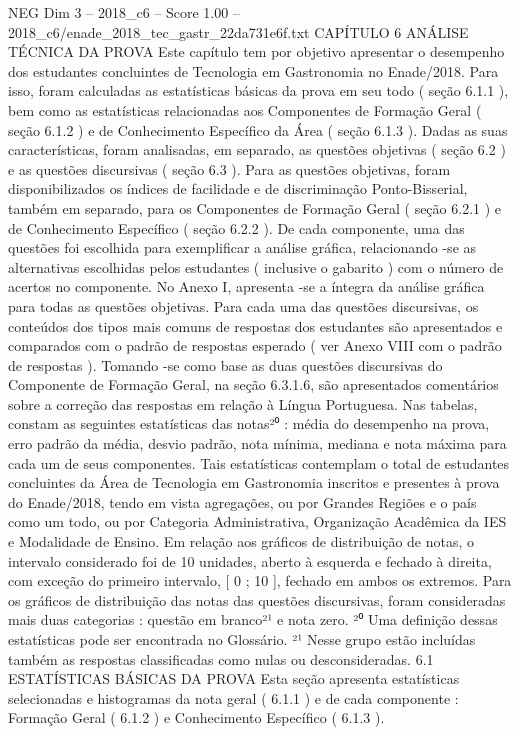 \begin{textsample}{NEG Dim 3 – 2018\_c6 – Score 1.00 – 2018\_c6/enade\_2018\_tec\_gastr\_22da731e6f.txt}  \label{ex:f3_neg_174}
CAPÍTULO 6 ANÁLISE TÉCNICA DA PROVA Este capítulo tem por objetivo apresentar o desempenho dos estudantes concluintes de Tecnologia em Gastronomia no Enade/2018.
Para isso, foram calculadas as estatísticas básicas da prova em seu todo ( seção 6.1.1 ), bem como as estatísticas relacionadas aos Componentes de Formação Geral ( seção 6.1.2 ) e de Conhecimento Específico da Área ( seção 6.1.3 ).
Dadas as suas características, foram analisadas, em separado, as questões objetivas ( seção 6.2 ) e as questões discursivas ( seção 6.3 ).
Para as questões objetivas, foram disponibilizados os índices de facilidade e de discriminação Ponto-Bisserial, também em separado, para os Componentes de Formação Geral ( seção 6.2.1 ) e de Conhecimento Específico ( seção 6.2.2 ).
De cada componente, uma das questões foi escolhida para exemplificar a análise gráfica, relacionando -se as alternativas escolhidas pelos estudantes ( inclusive o gabarito ) com o número de acertos no componente.
No Anexo I, apresenta -se a íntegra da análise gráfica para todas as questões objetivas.
Para cada uma das questões discursivas, os conteúdos dos tipos mais comuns de respostas dos estudantes são apresentados e comparados com o padrão de respostas esperado ( ver Anexo VIII com o padrão de respostas ).
Tomando -se como base as duas questões discursivas do Componente de Formação Geral, na seção 6.3.1.6, são apresentados comentários sobre a correção das respostas em relação à Língua Portuguesa.
Nas tabelas, constam as seguintes estatísticas das notas²⁰ : média do desempenho na prova, erro padrão da média, desvio padrão, nota mínima, mediana e nota máxima para cada um de seus componentes.
Tais estatísticas contemplam o total de estudantes concluintes da Área de Tecnologia em Gastronomia inscritos e presentes à prova do Enade/2018, tendo em vista agregações, ou por Grandes Regiões e o país como um todo, ou por Categoria Administrativa, Organização Acadêmica da IES e Modalidade de Ensino.
Em relação aos gráficos de distribuição de notas, o intervalo considerado foi de 10 unidades, aberto à esquerda e fechado à direita, com exceção do primeiro intervalo, [ 0 ; 10 ], fechado em ambos os extremos.
Para os gráficos de distribuição das notas das questões discursivas, foram consideradas mais duas categorias : questão em branco²¹ e nota zero. ²⁰ Uma definição dessas estatísticas pode ser encontrada no Glossário. ²¹ Nesse grupo estão incluídas também as respostas classificadas como nulas ou desconsideradas. 6.1 ESTATÍSTICAS BÁSICAS DA PROVA Esta seção apresenta estatísticas selecionadas e histogramas da nota geral ( 6.1.1 ) e de cada componente : Formação Geral ( 6.1.2 ) e Conhecimento Específico ( 6.1.3 ).

\end{textsample}
